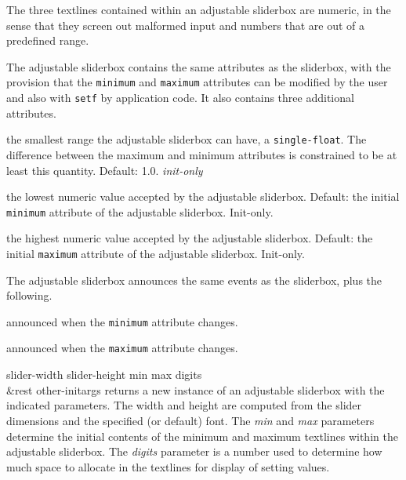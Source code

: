 \documentclass[twoside,openright,11pt]{report}
\newcommand{\tp}[1]{\texttt{#1}}
\begin{document}
The three textlines contained within an adjustable sliderbox are
numeric, in the sense that they screen out malformed input and numbers
that are out of a predefined range.


The adjustable sliderbox contains the same attributes as the
sliderbox, with the provision that the \tp{minimum} and
\tp{maximum} attributes can be modified by the user and also with
\tp{setf} by application code.  It also contains three additional
attributes.

{the smallest range the adjustable sliderbox can have, a
\tp{single-float}.  The difference between the maximum and minimum
attributes is constrained to be at least this quantity.  Default:
1.0. \emph{init-only}}

{the lowest numeric value accepted by the adjustable sliderbox.
Default: the initial \tp{minimum} attribute of the adjustable
sliderbox.  Init-only.}

{the highest numeric value accepted by the adjustable sliderbox.
Default: the initial \tp{maximum} attribute of the adjustable
sliderbox.  Init-only.}


The adjustable sliderbox announces the same events as the sliderbox,
plus the following.

{announced when the \tp{minimum} attribute changes.}

{announced when the \tp{maximum} attribute changes.}


{slider-width slider-height min max digits\\
	\hspace*{7cm} \&rest other-initargs}
{returns a new instance of an adjustable sliderbox with the indicated
parameters.  The width and height are computed from the slider
dimensions and the specified (or default) font.  The \emph{min} and
\emph{max} parameters determine the initial contents of the minimum
and maximum textlines within the adjustable sliderbox.  The
\emph{digits} parameter is a number used to determine
how much space to allocate in the textlines for display of setting
values.}
\end{document}
